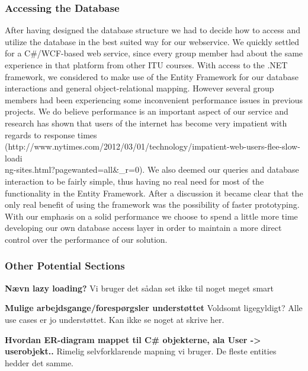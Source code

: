 \subsubsection{Accessing the Database}
\label{sec:databaseaccess}
After having designed the database structure we had to decide how to access and utilize the database in the best suited way for our webservice. We quickly settled for a C\#/WCF-based web service, since every group member had about the same experience in that platform from other ITU courses.
With access to the .NET framework, we considered to make use of the Entity Framework for our database interactions and general object-relational mapping. However several group members had been experiencing some inconvenient performance issues in previous projects. We do believe performance is an important aspect of our service and research has shown that users of the internet has become very impatient with regards to response times (http://www.nytimes.com/2012/03/01/technology/impatient-web-users-flee-slow-loadi\\ng-sites.html?pagewanted=all\&_r=0). We also deemed our queries and database interaction to be fairly simple, thus having no real need for most of the functionality in the Entity Framework. After a discussion it became clear that the only real benefit of using the framework was the possibility of faster prototyping. With our emphasis on a solid performance we choose to spend a little more time developing our own database access layer in order to maintain a more direct control over the performance of our solution.

\subsubsection{Other Potential Sections}
\textbf{Nævn lazy loading?}
Vi bruger det sådan set ikke til noget meget smart

\textbf{Mulige arbejdsgange/forespørgsler understøttet}
Voldsomt ligegyldigt? Alle use cases er jo understøttet. Kan ikke se noget at skrive her.

\textbf{Hvordan ER-diagram mappet til C\# objekterne, ala User -> userobjekt..}
Rimelig selvforklarende mapning vi bruger. De fleste entities hedder det samme.